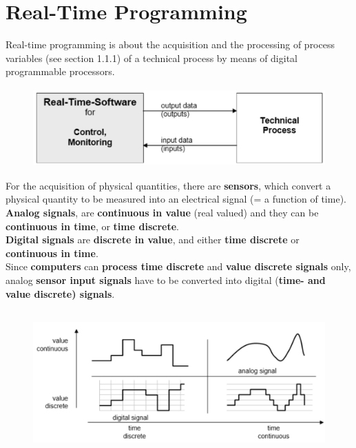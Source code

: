 \section{Real-Time Programming}

Real-time programming is about the acquisition and the processing of process variables (see section 1.1.1) of a technical process by means of digital programmable processors. 

    \begin{figure}[h]
    \centering
    \includegraphics[width=12cm, height=3cm]{Images/image135.png}
    \label{fig:Fig }
    \end{figure}
    
For the acquisition of physical quantities, there are \textbf{sensors}, which convert a physical quantity to be measured into an electrical signal (= a function of time).\\

\textbf{Analog signals}, are \textbf{continuous in value} (real valued) and they can be \textbf{continuous in time}, or \textbf{time discrete}. \\

\textbf{Digital signals} are \textbf{discrete in value}, and either \textbf{time discrete} or \textbf{continuous in time}.\\

Since \textbf{computers} can \textbf{process time discrete} and \textbf{value discrete signals} only, analog \textbf{sensor input signals} have to be converted into digital (\textbf{time- and value discrete) signals}.

    \begin{figure}[h]
    \centering
    \includegraphics[width=14cm, height=5.5cm]{Images/image136.png}
    \label{fig:Fig }
    \end{figure}

